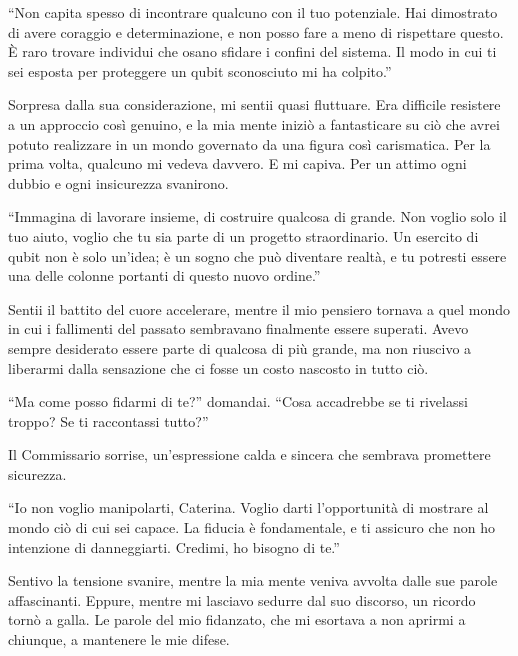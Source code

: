 \begin{dialogue}
 \enquote{Non capita spesso di incontrare qualcuno con il tuo potenziale. Hai dimostrato di avere coraggio e determinazione, e non posso fare a meno di rispettare questo. È raro trovare individui che osano sfidare i confini del sistema. Il modo in cui ti sei esposta per proteggere un qubit sconosciuto mi ha colpito.}
\end{dialogue}

Sorpresa dalla sua considerazione, mi sentii quasi fluttuare. Era difficile resistere a un approccio così genuino, e la mia mente iniziò a fantasticare su ciò che avrei potuto realizzare in un mondo governato da una figura così carismatica. Per la prima volta, qualcuno mi vedeva davvero. E mi capiva. Per un attimo ogni dubbio e ogni insicurezza  svanirono.

\begin{dialogue}
 \enquote{Immagina di lavorare insieme, di costruire qualcosa di grande. Non voglio solo il tuo aiuto, voglio che tu sia parte di un progetto straordinario. Un esercito di qubit non è solo un'idea; è un sogno che può diventare realtà, e tu potresti essere una delle colonne portanti di questo nuovo ordine.}
\end{dialogue}

Sentii il battito del cuore accelerare, mentre il mio pensiero tornava a quel mondo in cui i fallimenti del passato sembravano finalmente essere superati. Avevo sempre desiderato essere parte di qualcosa di più grande, ma non riuscivo a liberarmi dalla sensazione che ci fosse un costo nascosto in tutto ciò.

\begin{dialogue}
 \enquote{Ma come posso fidarmi di te?} domandai. \enquote{Cosa accadrebbe se ti rivelassi troppo? Se ti raccontassi tutto?}
\end{dialogue}

Il Commissario sorrise, un'espressione calda e sincera che sembrava promettere sicurezza.

\begin{dialogue}
 \enquote{Io non voglio manipolarti, Caterina. Voglio darti l'opportunità di mostrare al mondo ciò di cui sei capace. La fiducia è fondamentale, e ti assicuro che non ho intenzione di danneggiarti. Credimi, ho bisogno di te.}
\end{dialogue}

Sentivo la tensione svanire, mentre la mia mente veniva avvolta dalle sue parole affascinanti. Eppure, mentre mi lasciavo sedurre dal suo discorso, un ricordo tornò a galla. Le parole del mio fidanzato, che mi esortava a non aprirmi a chiunque, a mantenere le mie difese.

